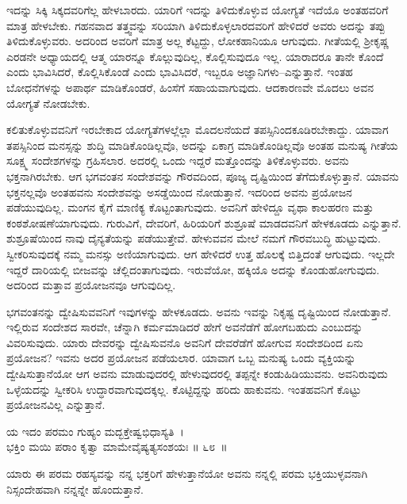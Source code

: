 ಇದನ್ನು ಸಿಕ್ಕಿ ಸಿಕ್ಕದವರಿಗೆಲ್ಲ ಹೇಳಬಾರದು. ಯಾರಿಗೆ ಇದನ್ನು ತಿಳಿದುಕೊಳ್ಳುವ ಯೋಗ್ಯತೆ ಇದೆಯೊ ಅಂತಹವರಿಗೆ ಮಾತ್ರ ಹೇಳಬೇಕು. ಗಹನವಾದ ತತ್ತ್ವವನ್ನು ಸರಿಯಾಗಿ ತಿಳಿದುಕೊಳ್ಳ\-ಲಾರದವರಿಗೆ ಹೇಳಿದರೆ ಅವರು ಅದನ್ನು ತಪ್ಪು ತಿಳಿದುಕೊಳ್ಳುವರು. ಅದರಿಂದ ಅವರಿಗೆ ಮಾತ್ರ ಅಲ್ಲ ಕೆಟ್ಟದ್ದು, ಲೋಕಹಾನಿಯೂ ಆಗುವುದು. ಗೀತೆಯಲ್ಲಿ ಶ‍್ರೀಕೃಷ್ಣ ಎರಡನೇ ಅಧ್ಯಾಯದಲ್ಲಿ ಆತ್ಮ ಯಾರನ್ನೂ ಕೊಲ್ಲುವುದಿಲ್ಲ, ಕೊಲ್ಲಿಸುವುದೂ ಇಲ್ಲ. ಯಾರಾದರೂ ತಾನೇ ಕೊಂದೆ ಎಂದು ಭಾವಿಸಿದರೆ, ಕೊಲ್ಲಿಸಿಕೊಂಡೆ ಎಂದು ಭಾವಿಸಿದರೆ, ಇಬ್ಬರೂ ಅಜ್ಞಾನಿಗಳು–ಎನ್ನುತ್ತಾನೆ. ಇಂತಹ ಬೋಧನೆಗಳನ್ನು ಅಪಾರ್ಥ ಮಾಡಿಕೊಂಡರೆ, ಹಿಂಸೆಗೆ ಸಹಾಯವಾಗುವುದು. ಆದಕಾರಣವೇ ಮೊದಲು ಅವನ ಯೋಗ್ಯತೆ ನೋಡಬೇಕು.

ಕಲಿತುಕೊಳ್ಳುವವನಿಗೆ ಇರಬೇಕಾದ ಯೋಗ್ಯತೆಗಳಲ್ಲೆಲ್ಲಾ ಮೊದಲನೆಯದೆ ತಪಸ್ಸಿನಿಂದ\break ಕೂಡಿರಬೇಕಾದ್ದು. ಯಾವಾಗ ತಪಸ್ಸಿನಿಂದ ಮನಸ್ಸನ್ನು ಶುದ್ಧಿ ಮಾಡಿಕೊಂಡಿಲ್ಲವೊ, ಅದನ್ನು ಏಕಾಗ್ರ ಮಾಡಿಕೊಂಡಿಲ್ಲವೊ ಅಂತಹ ಮನುಷ್ಯ ಗೀತೆಯ ಸೂಕ್ಷ್ಮ ಸಂದೇಶಗಳನ್ನು ಗ್ರಹಿಸಲಾರ. ಅದರಲ್ಲಿ ಒಂದು ಇದ್ದರೆ ಮತ್ತೊಂದನ್ನು ತಿಳಿಕೊಳ್ಳುವರು. ಅವನು ಭಕ್ತನಾಗಿರಬೇಕು. ಆಗ ಭಗವಂತನ ಸಂದೇಶವನ್ನು ಗೌರವದಿಂದ, ಪೂಜ್ಯ ದೃಷ್ಟಿಯಿಂದ ತೆಗೆದುಕೊಳ್ಳುತ್ತಾನೆ. ಯಾವನು ಭಕ್ತನಲ್ಲವೊ ಅಂತಹವನು ಸಂದೇಶವನ್ನು ಅಸಡ್ಡೆಯಿಂದ ನೋಡುತ್ತಾನೆ. ಇದರಿಂದ ಅವನು ಪ್ರಯೋಜನ ಪಡೆಯುವುದಿಲ್ಲ. ಮಂಗನ ಕೈಗೆ ಮಾಣಿಕ್ಯ ಕೊಟ್ಟಂತಾಗುವುದು. ಅವನಿಗೆ ಹೇಳಿದ್ದೂ ವೃಥಾ ಕಾಲಹರಣ ಮತ್ತು ಕಂಠಶೋಷಣೆಯಾಗುವುದು. ಗುರುವಿಗೆ, ದೇವರಿಗೆ, ಹಿರಿಯರಿಗೆ ಶುಶ್ರೂಷೆ ಮಾಡದವನಿಗೆ ಹೇಳಕೂಡದು ಎನ್ನುತ್ತಾನೆ. ಶುಶ್ರೂಷೆಯಿಂದ ನಾವು ದೈನ್ಯತೆಯನ್ನು ಪಡೆಯುತ್ತೇವೆ. ಹೇಳುವವನ ಮೇಲೆ ನಮಗೆ ಗೌರವಬುದ್ಧಿ ಹುಟ್ಟುವುದು. ಸ್ವೀಕರಿಸುವುದಕ್ಕೆ ನಮ್ಮ ಮನಸ್ಸು ಅಣಿಯಾಗುವುದು. ಆಗ ಹೇಳಿದರೆ ಉತ್ತ ಹೊಲಕ್ಕೆ ಬಿತ್ತಿದಂತೆ ಆಗುವುದು. ಇಲ್ಲದೇ ಇದ್ದರೆ ದಾರಿಯಲ್ಲಿ ಬೀಜವನ್ನು ಚೆಲ್ಲಿದಂತಾಗುವುದು. ಇರುವೆಯೋ, ಹಕ್ಕಿಯೊ ಅದನ್ನು ಕೊಂಡುಹೋಗುವುದು. ಅದರಿಂದ ಮತ್ತಾವ ಪ್ರಯೋಜನವೂ ಆಗುವುದಿಲ್ಲ.

ಭಗವಂತನನ್ನು ದ್ವೇಷಿಸುವವನಿಗೆ ಇವುಗಳನ್ನು ಹೇಳಕೂಡದು. ಅವನು ಇವನ್ನು ನಿಕೃಷ್ಟ ದೃಷ್ಟಿಯಿಂದ ನೋಡುತ್ತಾನೆ. ಇಲ್ಲಿರುವ ಸಂದೇಶದ ಸಾರವೇ, ಚೆನ್ನಾಗಿ ಕರ್ಮಮಾಡಿದರೆ ಹೇಗೆ ಅವನೆಡೆಗೆ ಹೋಗಬಹುದು ಎಂಬುದನ್ನು ವಿವರಿಸುವುದು. ಯಾರು ದೇವರನ್ನು ದ್ವೇಷಿಸುವನೊ ಅವನಿಗೆ ದೇವರೆಡೆಗೆ ಹೋಗುವ ಸಂದೇಶದಿಂದ ಏನು ಪ್ರಯೋಜನ? ಇವನು ಅದರ ಪ್ರಯೋಜನ ಪಡೆಯಲಾರ. ಯಾವಾಗ ಒಬ್ಬ ಮನುಷ್ಯ ಒಂದು ವ್ಯಕ್ತಿಯನ್ನು ದ್ವೇಷಿಸುತ್ತಾನೆಯೋ ಆಗ ಅವನು ಮಾಡುವುದರಲ್ಲಿ ಹೇಳುವುದರಲ್ಲಿ ತಪ್ಪನ್ನೇ ಕಂಡುಹಿಡಿಯುವನು. ಅವನಿರುವುದು ಒಳ್ಳೆಯದನ್ನು ಸ್ವೀಕರಿಸಿ ಉದ್ಧಾರವಾಗುವುದಕ್ಕಲ್ಲ. ಕೊಟ್ಟಿದ್ದನ್ನು ಹರಿದು ಹಾಕುವನು. ಇಂತಹವನಿಗೆ ಕೊಟ್ಟು ಪ್ರಯೋಜನವಿಲ್ಲ ಎನ್ನುತ್ತಾನೆ.

\begin{shloka}
ಯ ಇದಂ ಪರಮಂ ಗುಹ್ಯಂ ಮದ್ಭಕ್ತೇಷ್ವಭಿಧಾಸ್ಯತಿ~।\\ಭಕ್ತಿಂ ಮಯಿ ಪರಾಂ ಕೃತ್ವಾ ಮಾಮೇವೈಷ್ಯತ್ಯಸಂಶಯಃ \hfill॥ ೬೮~॥
\end{shloka}

\begin{artha}
ಯಾರು ಈ ಪರಮ ರಹಸ್ಯವನ್ನು ನನ್ನ ಭಕ್ತರಿಗೆ ಹೇಳುತ್ತಾನೆಯೋ ಅವನು ನನ್ನಲ್ಲಿ ಪರಮ ಭಕ್ತಿಯುಳ್ಳವನಾಗಿ ನಿಸ್ಸಂದೇಹವಾಗಿ ನನ್ನನ್ನೇ ಹೊಂದುತ್ತಾನೆ.
\end{artha}

